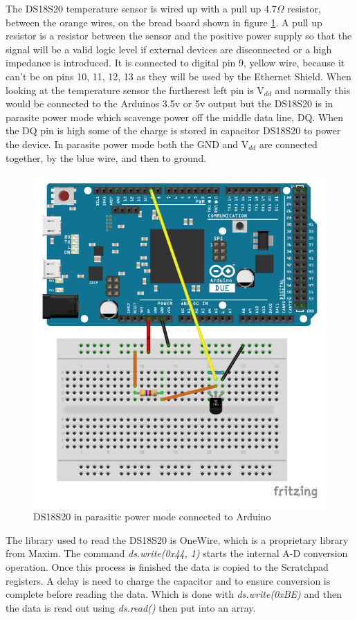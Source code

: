 The DS18S20 temperature sensor is wired up with a pull up 4.7$\Omega$ resistor, between the orange wires, on the bread board shown in figure \ref{fig:tempcircuit}. A pull up resistor is a resistor between the sensor and the positive power supply so that the signal will be a valid logic level if external devices are disconnected or a high impedance is introduced. It is connected to digital pin 9, yellow wire, because it can't be on pins 10, 11, 12, 13 as they will be used by the Ethernet Shield. When looking at the temperature sensor the furtherest left pin is V$_{dd}$ and normally this would be connected to the Arduinos 3.5v or 5v output but the DS18S20 is in parasite power mode which scavenge power off the middle data line, DQ. When the DQ pin is high some of the charge is stored in capacitor DS18S20 to power the device. In parasite power mode both the GND and V$_{dd}$ are connected together, by the blue wire, and then to ground.

\begin{figure}[h]
	\centering
	\includegraphics[width=.5\linewidth]{Figures/TempSensor_bb.pdf}
	\caption{DS18S20 in parasitic power mode connected to Arduino}
	\label{fig:tempcircuit}
\end{figure}

The library used to read the DS18S20 is OneWire, which is a proprietary library from Maxim. The command \emph{ds.write(0x44, 1)} starts the internal A-D conversion operation. Once this process is finished the data is copied to the Scratchpad registers. A delay is need to charge the capacitor and to ensure conversion is complete before reading the data. Which is done with \emph{ds.write(0xBE)} and then the data is read out using \emph{ds.read()} then put into an array.

